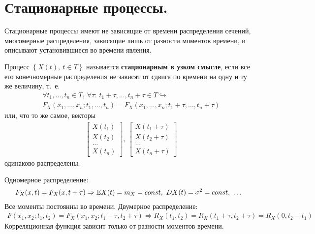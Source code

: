 \section{Стационарные процессы.}
Стационарные процессы имеют не зависящие от времени распределения сечений,
многомерные распределения, зависящие лишь от разности моментов времени, и
описывают установившиеся во времени явления.
\begin{Def}
    Процесс $\left\{ X(t), \ t \in T \right\}$ называется \textbf{стационарным в
      узком смысле}, если все его конечномерные распределения не зависят от сдвига
    по времени на одну и ту же величину, т.~е.
    \begin{align*}
      & \forall t_1, \dots, t_n \in T, \ \forall \tau: \ t_1+\tau, \dots, t_n + \tau \in T \hookrightarrow \\
      & F_X(x_1, \dots, x_n; t_1, \dots, t_n) = F_X(x_1, \dots, x_n; t_1 + \tau, \dots, t_n+\tau)
    \end{align*}
    или, что то же самое, векторы
    \begin{align*}
      & \left[ \begin{matrix}
              X(t_1) \\
              X(t_2) \\
              \dots \\
              X(t_n)
          \end{matrix} \right], \  \left[ \begin{matrix}
              X(t_1+\tau) \\
              X(t_2+\tau) \\
              \dots \\
              X(t_n+\tau)
          \end{matrix} \right]
    \end{align*}
    одинаково распределены.
\end{Def}
\begin{example}
    Одномерное распределение:
    \begin{align*}
      F_X(x,t) = F_X(x, t + \tau) \Rightarrow \EE X(t) = m_X = const , \ D X(t) = \sigma^2 = const, \ \dots
    \end{align*}
    Все моменты постоянны во времени.
    Двумерное распределение:
    \begin{align*}
      F(x_1,x_2; t_1, t_2) = F_X(x_1, x_2; t_1 + \tau, t_2 + \tau) \Rightarrow R_X(t_1,t_2) = R_X(t_1+\tau, t_2+\tau) = R_X(0, t_2-t_1)
    \end{align*}
    Корреляционная функция зависит только от разности моментов времени.
\end{example}
